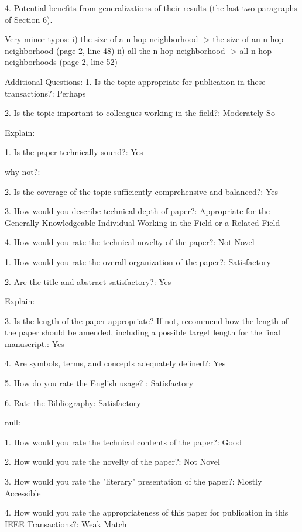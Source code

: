 4. Potential benefits from generalizations of their results (the last
two paragraphs of Section 6).

Very minor typos: i) the size of a n-hop neighborhood -> the size of
an n-hop neighborhood (page 2, line 48) ii) all the n-hop neighborhood
-> all n-hop neighborhoods (page 2, line 52)

Additional Questions:
1. Is the topic appropriate for publication in these transactions?: Perhaps

2. Is the topic important to colleagues working in the field?: Moderately So

Explain:

1. Is the paper technically sound?: Yes

why not?:

2. Is the coverage of the topic sufficiently comprehensive and balanced?: Yes

3. How would you describe technical depth of paper?: Appropriate for
the Generally Knowledgeable Individual Working in the Field or a
Related Field

4. How would you rate the technical novelty of the paper?: Not Novel

1. How would you rate the overall organization of the paper?: Satisfactory

2. Are the title and abstract satisfactory?: Yes

Explain:

3. Is the length of the paper appropriate? If not, recommend how the
length of the paper should be amended, including a possible target
length for the final manuscript.: Yes

4. Are symbols, terms, and concepts adequately defined?: Yes

5. How do you rate the English usage? : Satisfactory

6. Rate the Bibliography: Satisfactory

null:

1. How would you rate the technical contents of the paper?: Good

2. How would you rate the novelty of the paper?: Not Novel

3. How would you rate the "literary" presentation of the paper?: Mostly Accessible

4. How would you rate the appropriateness of this paper for
publication in this IEEE Transactions?: Weak Match
